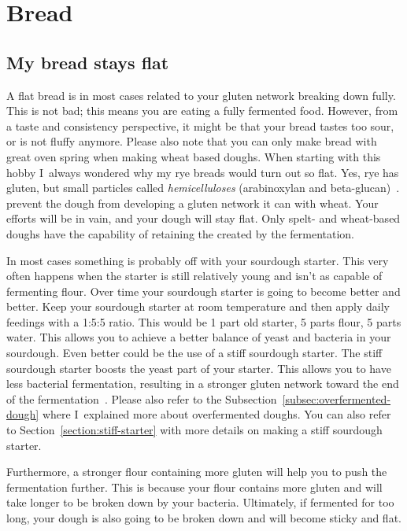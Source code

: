 \section{Bread}
\subsection{My bread stays flat}

A flat bread is in most cases related to your gluten
network breaking down fully. This is not bad; this
means you are eating a fully fermented food. However,
from a taste and consistency perspective, it might be
that your bread tastes too sour, or is not fluffy anymore.
Please also note that you can only make bread with
great oven spring when making wheat based doughs. When
starting with this hobby I~always wondered why my rye
breads would turn out so flat. Yes, rye has gluten, but
small particles called \emph{hemicelluloses} (arabinoxylan and beta-glucan)~\cite{rye-defects}.
prevent the dough from developing a gluten network it can
with wheat. Your efforts will be in vain, and your dough will
stay flat. Only spelt- and wheat-based doughs have the capability
of retaining the  created by the fermentation.

In most cases something is probably off with your
sourdough starter. This very often happens when the starter
is still relatively young and isn't as capable of
fermenting flour. Over time your sourdough
starter is going to become better and better.
Keep your sourdough starter at room temperature
and then apply daily feedings with a 1:5:5 ratio.
This would be 1 part old starter, 5 parts flour,
5 parts water. This allows you to achieve a better
balance of yeast and bacteria in your sourdough.
Even better could be the use of a stiff sourdough
starter. The stiff sourdough starter boosts
the yeast part of your starter. This allows you
to have less bacterial fermentation, resulting
in a stronger gluten network toward the end
of the fermentation~\cite{stiff+starter}. Please
also refer to the Subsection~\ref{subsec:overfermented-dough} where
I~explained more about overfermented doughs. You can also
refer to Section~\ref{section:stiff-starter} with more details on
making a stiff sourdough starter.

Furthermore, a stronger flour containing more gluten
will help you to push the fermentation further. This
is because your flour contains more gluten and will
take longer to be broken down by your bacteria. Ultimately,
if fermented for too long, your dough is also going
to be broken down and will become sticky and flat.

